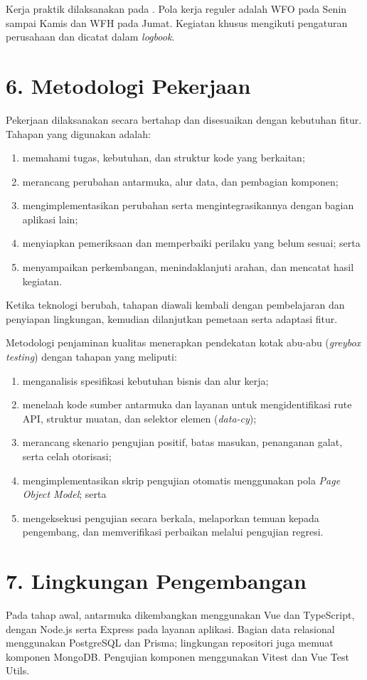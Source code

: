 Kerja praktik dilaksanakan pada \PeriodeKP. Pola kerja reguler adalah WFO pada Senin sampai Kamis dan WFH pada Jumat. Kegiatan khusus mengikuti pengaturan perusahaan dan dicatat dalam \textit{logbook}.

\section*{6. Metodologi Pekerjaan}
Pekerjaan dilaksanakan secara bertahap dan disesuaikan dengan kebutuhan fitur. Tahapan yang digunakan adalah:
\begin{enumerate}[label=\roman*)]
\item memahami tugas, kebutuhan, dan struktur kode yang berkaitan;
\item merancang perubahan antarmuka, alur data, dan pembagian komponen;
\item mengimplementasikan perubahan serta mengintegrasikannya dengan bagian aplikasi lain;
\item menyiapkan pemeriksaan dan memperbaiki perilaku yang belum sesuai; serta
\item menyampaikan perkembangan, menindaklanjuti arahan, dan mencatat hasil kegiatan.
\end{enumerate}
Ketika teknologi berubah, tahapan diawali kembali dengan pembelajaran dan penyiapan lingkungan, kemudian dilanjutkan pemetaan serta adaptasi fitur.

Metodologi penjaminan kualitas menerapkan pendekatan kotak abu-abu (\textit{greybox testing}) dengan tahapan yang meliputi:
\begin{enumerate}[label=\alph*)]
\item menganalisis spesifikasi kebutuhan bisnis dan alur kerja;
\item menelaah kode sumber antarmuka dan layanan untuk mengidentifikasi rute API, struktur muatan, dan selektor elemen (\textit{data-cy});
\item merancang skenario pengujian positif, batas masukan, penanganan galat, serta celah otorisasi;
\item mengimplementasikan skrip pengujian otomatis menggunakan pola \textit{Page Object Model}; serta
\item mengeksekusi pengujian secara berkala, melaporkan temuan kepada pengembang, dan memverifikasi perbaikan melalui pengujian regresi.
\end{enumerate}

\section*{7. Lingkungan Pengembangan}
Pada tahap awal, antarmuka dikembangkan menggunakan Vue dan TypeScript, dengan Node.js serta Express pada layanan aplikasi. Bagian data relasional menggunakan PostgreSQL dan Prisma; lingkungan repositori juga memuat komponen MongoDB. Pengujian komponen menggunakan Vitest dan Vue Test Utils.

